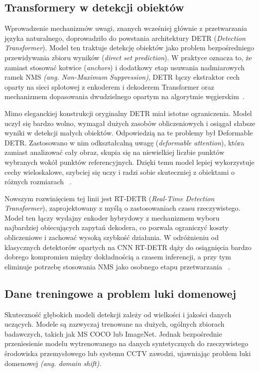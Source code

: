\subsection{Transformery w detekcji obiektów}

Wprowadzenie mechanizmów uwagi, znanych wcześniej głównie z przetwarzania języka naturalnego,
doprowadziło do powstania architektury DETR (\textit{Detection Transformer}). Model ten traktuje
detekcję obiektów jako problem bezpośredniego przewidywania zbioru wyników (\textit{direct set
  prediction}). W praktyce oznacza to, że zamiast stosować kotwice (\textit{anchors}) i dodatkowy
etap usuwania nadmiarowych ramek NMS \textit{(ang. Non-Maximum Suppression)}, DETR łączy ekstraktor
cech oparty na sieci splotowej z enkoderem i dekoderem Transformer oraz mechanizmem dopasowania
dwudzielnego opartym na algorytmie węgierskim~\cite{carion2020end}.

Mimo eleganckiej konstrukcji oryginalny DETR miał istotne ograniczenia. Model uczył się bardzo
wolno, wymagał dużych zasobów obliczeniowych i osiągał słabsze wyniki w detekcji małych obiektów.
Odpowiedzią na te problemy był Deformable DETR. Zastosowano w nim odkształcalną uwagę
(\textit{deformable attention}), która zamiast analizować cały obraz, skupia się na niewielkiej
liczbie punktów wybranych wokół punktów referencyjnych. Dzięki temu model lepiej wykorzystuje cechy
wieloskalowe, szybciej się uczy i radzi sobie skuteczniej z obiektami o różnych rozmiarach
~\cite{zhu2021deformable}.

Nowszym rozwinięciem tej linii jest RT-DETR (\textit{Real-Time Detection Transformer}),
zaprojektowany z myślą o zastosowaniach czasu rzeczywistego. Model ten łączy wydajny enkoder
hybrydowy z mechanizmem wyboru najbardziej obiecujących zapytań dekodera, co pozwala ograniczyć
koszty obliczeniowe i zachować wysoką szybkość działania. W odróżnieniu od klasycznych detektorów
opartych na CNN RT-DETR dąży do osiągnięcia bardzo dobrego kompromisu między dokładnością a czasem
inferencji, a przy tym eliminuje potrzebę stosowania NMS jako osobnego etapu przetwarzania
~\cite{zhao2024detrs}.

\subsection{Dane treningowe a problem luki domenowej}

Skuteczność głębokich modeli detekcji zależy od wielkości i jakości danych uczących. Modele są
zazwyczaj trenowane na dużych, ogólnych zbiorach badawczych, takich jak MS COCO lub ImageNet.
Jednak bezpośrednie przeniesienie modelu wytrenowanego na danych syntetycznych do rzeczywistego
środowiska przemysłowego lub systemu CCTV zawodzi, ujawniając problem luki domenowej \textit{(ang.
  domain shift)}\~\cite{he2024}.

